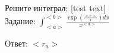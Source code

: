 \documentclass{article}%
\begin{document}
\begin{problem*}Решите интеграл: [test text] \\Задание: $ \int_{<a>}^{<b>} \frac{\exp(\frac{<c>}{x})dx}{x^{<d>}} $\end{problem*}

\begin{solution*}
Ответ: $<r_a>$
\end{solution*}
\end{document}
